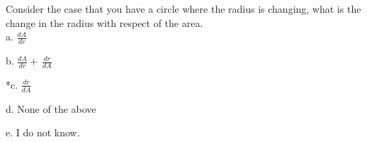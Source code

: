 
Consider the case that you have a circle where the radius is changing, what is the change in the radius with respect of the area. \\

a. \(\frac{dA}{dr}\)

b. \(\frac{dA}{dr} + \ \frac{dr}{dA}\)

*c. \(\frac{dr}{dA}\)

d. None of the above

e. I do not know.\\
